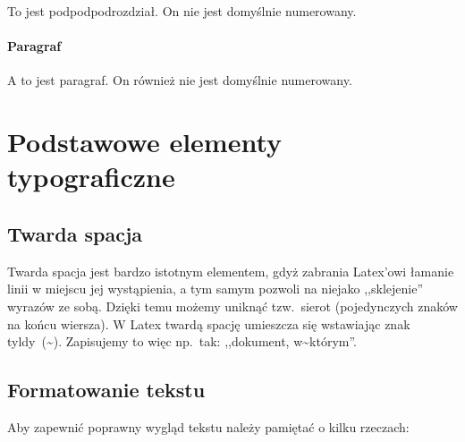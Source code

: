 \documentclass[twoside,a4paper]{book}
\begin{document}
To jest podpodpodrozdział. On nie jest domyślnie numerowany.

\paragraph{Paragraf}

A to jest paragraf. On również nie jest domyślnie numerowany.

\section{Podstawowe elementy typograficzne}

\subsection{Twarda spacja}

Twarda spacja jest bardzo istotnym elementem, gdyż zabrania Latex'owi łamanie linii w miejscu jej wystąpienia, a tym samym pozwoli na niejako ,,sklejenie'' wyrazów ze sobą. Dzięki temu możemy uniknąć tzw.\ sierot (pojedynczych znaków na końcu wiersza). W Latex twardą spację umieszcza się wstawiając znak tyldy~(\textasciitilde). Zapisujemy to więc np.\ tak: ,,dokument, w{\textasciitilde}którym''.

\subsection{Formatowanie tekstu}

Aby zapewnić poprawny wygląd tekstu należy pamiętać o kilku rzeczach:
\end{document}
